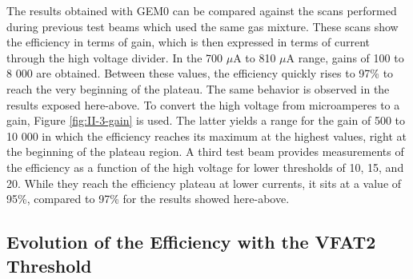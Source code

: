       The results obtained with GEM0 can be compared against the scans performed during previous test beams \cite{Abbaneo:1709907, Abbaneo:1401079} which used the same gas mixture. These scans show the efficiency in terms of gain, which is then expressed in terms of current through the high voltage divider. In the 700 $\mu$A to 810 $\mu$A range, gains of 100 to 8 000 are obtained. Between these values, the efficiency quickly rises to 97\% to reach the very beginning of the plateau. The same behavior is observed in the results exposed here-above. To convert the high voltage from microamperes to a gain, Figure \ref{fig:II-3-gain} is used. The latter yields a range for the gain of 500 to 10 000 in which the efficiency reaches its maximum at the highest values, right at the beginning of the plateau region. A third test beam \cite{Abbaneo:1494965} provides measurements of the efficiency as a function of the high voltage for lower thresholds of 10, 15, and 20. While they reach the efficiency plateau at lower currents, it sits at a value of 95\%, compared to 97\% for the results showed here-above.

    \subsection{Evolution of the Efficiency with the VFAT2 Threshold}

